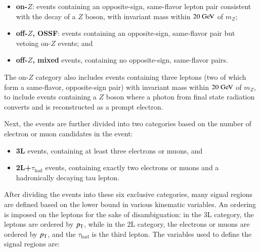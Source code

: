 \begin{itemize}
	\item \textbf{on-$Z$}: events containing an opposite-sign, same-flavor lepton pair consistent with the decay of a $Z$ boson, with invariant mass within $20 \GeV$ of $m_Z$;
	\item \textbf{off-$Z$, OSSF}:  events containing an opposite-sign, same-flavor pair but vetoing on-$Z$ events; and
	\item \textbf{off-$Z$, mixed} events, containing no opposite-sign, same-flavor pairs.
\end{itemize}

The on-$Z$ category also includes events containing three leptons (two of which form a same-flavor, opposite-sign pair) with invariant mass within $20 \GeV$ of $m_Z$, to include events containing a $Z$ boson where a photon from final state radiation converts and is reconstructed as a prompt electron.

Next, the events are further divided into two categories based on the number of electron or muon candidates in the event:

\begin{itemize}
	\item \textbf{3L} events, containing at least three electrons or muons, and
	\item \textbf{2L+$\tau_{\mathrm{had}}$} events, containing exactly two electrons or muons and a hadronically decaying tau lepton.
\end{itemize}

After dividing the events into these six exclusive categories, many signal regions are defined based on the lower bound in various kinematic variables. An ordering is imposed on the leptons for the sake of disambiguation: in the 3L category, the leptons are ordered by $p_{\text{T}}$, while in the 2L category, the electrons or muons are ordered by $p_{\text{T}}$, and the $\tau_{\mathrm{had}}$ is the third lepton.  The variables used to define the signal regions are:

